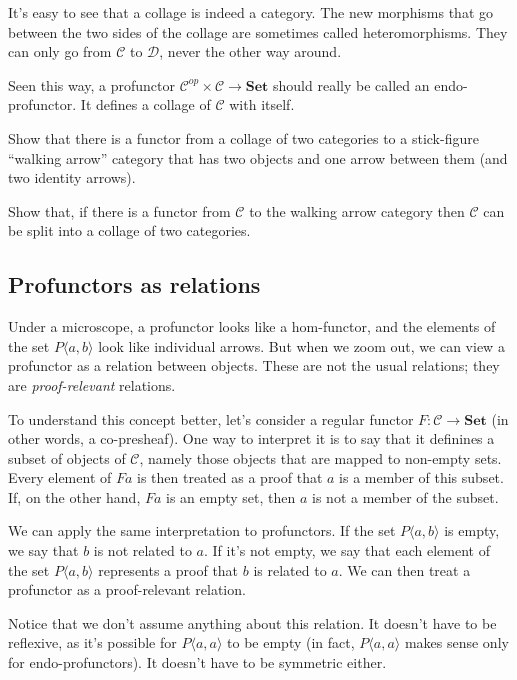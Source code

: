 \documentclass[DaoFP]{subfiles}
\begin{document}
It's easy to see that a collage is indeed a category. The new morphisms that go between the two sides of the collage are sometimes called heteromorphisms. They can only go from $\mathcal{C}$ to $\mathcal{D}$, never the other way around. 

Seen this way, a profunctor $ \mathcal{C}^{op} \times  \mathcal{C} \to \mathbf{Set}$ should really be called an endo-profunctor. It defines a collage of $\mathcal{C}$ with itself.

\begin{exercise}
Show that there is a functor from a collage of two categories to a stick-figure ``walking arrow'' category that has two objects and one arrow between them (and two identity arrows).
\end{exercise}
\begin{exercise}
Show that, if there is a functor from $\mathcal{C}$ to the walking arrow category then $\mathcal{C}$ can be split into a collage of two categories. 
\end{exercise}

\subsection{Profunctors as relations}

Under a microscope, a profunctor looks like a hom-functor, and the elements of the set $P \langle a, b \rangle$ look like individual arrows. But when we zoom out, we can view a profunctor as a relation between objects. These are not the usual relations; they are \emph{proof-relevant} relations.

To understand this concept better, let's consider a regular functor $F \colon \mathcal{C} \to \mathbf{Set}$ (in other words, a co-presheaf). One way to interpret it is to say that it definines a subset of objects of $\mathcal{C}$, namely those objects that are mapped to non-empty sets. Every element of $F a$ is then treated as a proof that $a$ is a member of this subset. If, on the other hand, $F a$ is an empty set, then $a$ is not a member of the subset.

We can apply the same interpretation to profunctors. If the set $P \langle a, b \rangle$ is empty, we say that $b$ is not related to $a$. If it's not empty, we say that each element of the set $P \langle a, b \rangle$ represents a proof that $b$ is related to $a$. We can then treat a profunctor as a proof-relevant relation. 

Notice that we don't assume anything about this relation. It doesn't have to be reflexive, as it's possible for $P \langle a, a \rangle$ to be empty (in fact, $P \langle a, a \rangle$ makes sense only for endo-profunctors). It doesn't have to be symmetric either.
\end{document}
